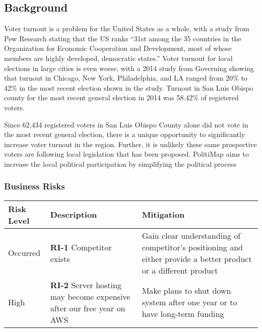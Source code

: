 % 

\subsection{Background}
Voter turnout is a problem for the United States as a whole, with a
study from Pew Research stating that the US ranks “31st among the 35
countries in the Organization for Economic Cooperation and
Development, most of whose members are highly developed, democratic
states.”  \cite{pew} Voter turnout for local elections in large cities
is even worse, with a 2014 study from Governing showing that turnout
in Chicago, New York, Philadelphia, and LA ranged from 20\% to 42\% in
the most recent election shown in the study. \cite{governing} Turnout
in San Luis Obispo county for the most recent general election in 2014
was 58.42\% of registered voters. \cite{slocounty}

Since 62,434 registered voters in San Luis Obispo County alone did not vote in the most recent
general election, there is a unique opportunity to significantly increase
voter turnout in the region. Further, it is unlikely these same prospective voters are following local legislation that has been proposed. PolitiMap aims to increase the local political participation by simplifying the political process

\subsubsection{Business Risks}
\begin{tabu}{lXX}
  \toprule
  Risk Level & Description & Mitigation \\
  \midrule
  Occurred &
  \textbf{RI-1} Competitor exists &
  Gain clear
  understanding of competitor's positioning and either provide a
  better product or a different product\\

  High &
  \textbf{RI-2} Server hosting may become expensive after our
  free year on AWS &
  Make plans to shut down system after one year or to
  have long-term funding \\
  \bottomrule
\end{tabu}

